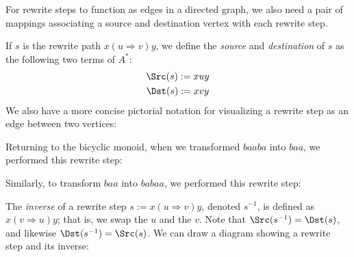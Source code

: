 \documentclass[../generics]{subfiles}
\begin{document}
For rewrite steps to function as edges in a directed graph, we also need a pair of mappings associating a source and destination vertex with each rewrite step.
\begin{definition}
If $s$ is the rewrite path $x(u\Rightarrow v)y$, we define the \emph{source} and \emph{destination} of $s$ as the following two terms of $A^*$:
\begin{gather*}
\Src(s) := xuy\\
\Dst(s) := xvy
\end{gather*}
We also have a more concise pictorial notation for visualizing a rewrite step as an edge between two vertices:
\begin{quote}
\end{quote}
\end{definition}
\begin{example}
Returning to the bicyclic monoid, when we transformed $baaba$ into $baa$, we performed this rewrite step:
\begin{quote}
\end{quote}
Similarly, to transform $baa$ into $babaa$, we performed this rewrite step:
\begin{quote}
\end{quote}
\end{example}
\begin{definition}
The \emph{inverse} of a rewrite step $s:=x(u\Rightarrow v)y$, denoted $s^{-1}$, is defined as $x(v\Rightarrow u)y$; that is, we swap the $u$ and the $v$. Note that $\Src(s^{-1})=\Dst(s)$, and likewise $\Dst(s^{-1})=\Src(s)$. We can draw a diagram showing a rewrite step and its inverse:
\begin{quote}
\end{quote}
\end{definition}
\end{document}
